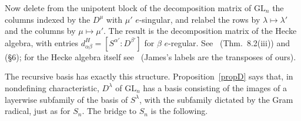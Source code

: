 \documentclass[11pt, letterpaper]{amsart}
\theoremstyle{definition}
\theoremstyle{remark}
\newcommand{\GL}{\mathrm{GL}}
\begin{document}
Now delete from the unipotent block of the decomposition matrix of $\GL_n$ the columns indexed by the $D^\mu$ with $\mu'$ $e$-singular, and relabel the rows by $\lambda\mapsto\lambda'$ and the columns by $\mu\mapsto\mu'$. The result is the decomposition matrix of the Hecke algebra, with entries $d^H_{\alpha\beta}=[S^{\alpha'}:D^{\beta'}]$ for $\beta$ $e$-regular. See~\cite{Jam86} (Thm.~8.2(iii)) and~\cite{DJid} (\S6); for the Hecke algebra itself see~\cite[Thms.~7.6, 7.7]{DJH} (James's labels are the transposes of ours).

The recursive basis has exactly this structure. Proposition~\ref{propD} says that, in nondefining characteristic, $D^\lambda$ of $\GL_n$ has a basis consisting of the images of a layerwise subfamily of the basis of $S^\lambda$, with the subfamily dictated by the Gram radical, just as for $S_n$. The bridge to $S_n$ is the following.
\end{document}
